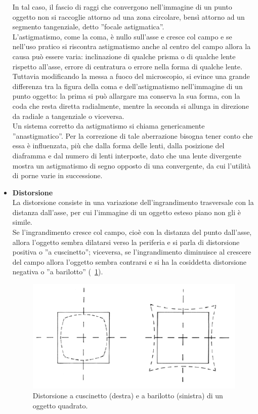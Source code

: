 \begin{itemize}
In tal caso, il fascio di raggi che convergono nell'immagine di un punto oggetto non si raccoglie attorno ad una zona circolare, bensì attorno ad un segmento tangenziale, detto ''focale astigmatica''.\\
L'astigmatismo, come la coma, è nullo sull'asse e cresce col campo e se nell'uso pratico si riscontra astigmatismo anche al centro del campo allora la causa può essere varia: inclinazione di qualche prisma o di qualche lente rispetto all'asse, errore di centratura o errore nella forma di qualche lente. Tuttavia modificando la messa a fuoco del microscopio, si evince una grande differenza tra la figura della coma e dell'astigmatismo nell'immagine di un punto oggetto: la prima si può allargare ma conserva la sua forma, con la coda che resta diretta radialmente, mentre la seconda si allunga in direzione da radiale a tangenziale o viceversa. \\
Un sistema corretto da astigmatismo si chiama genericamente ''anastigmatico''. Per la correzione di tale aberrazione bisogna tener conto che essa è influenzata, più che dalla forma delle lenti, dalla posizione del diaframma e dal numero di lenti interposte, dato che una lente divergente mostra un astigmatismo di segno opposto di una convergente, da cui l'utilità di porne varie in successione.\\

\item \textbf{Distorsione}\\
La distorsione consiste in una variazione dell'ingrandimento trasversale con la distanza dall'asse, per cui l'immagine di un oggetto esteso piano non gli è simile. \\
Se l'ingrandimento cresce col campo, cioè con la distanza del punto dall'asse, allora l'oggetto sembra dilatarsi verso la periferia e si parla di distorsione positiva o ''a cuscinetto''; viceversa, se l'ingrandimento diminuisce al crescere del campo allora l'oggetto sembra contrarsi e si ha la cosiddetta distorsione negativa o ''a barilotto'' (\figurename~\ref{fig:distorsione}).

\begin{figure}[!ht]
 \centering
 \includegraphics[scale=.60]{img/CAP2disto.png}
 \caption{\small{Distorsione a cuscinetto (destra) e a barilotto (sinistra) di un oggetto quadrato.}}
 \label{fig:distorsione}
\end{figure}


\end{itemize}

